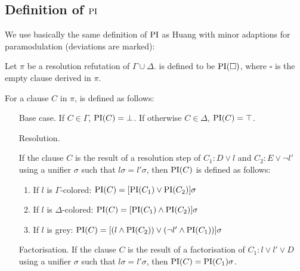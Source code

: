 \documentclass[,%
	paper=a4,%
	DIV14, 
	liststotoc,
	bibtotoc,
	draft=false,%
	numbers=noendperiod
]{scrartcl}
\begin{document}
\subsection{Definition of $\operatorname{PI}$}

We use basically the same definition of $\operatorname{PI}$ as Huang with minor adaptions for paramodulation (deviations are marked):
\begin{defi}
	Let $\pi$ be a resolution refutation of $\Gamma \cup \Delta$.
	 is defined to be $\operatorname{PI}(\square)$, where $\square$ is the empty clause derived in $\pi$.

	For a clause $C$ in $\pi$,  is defined as follows:
	\label{def:PI}
	\begin{itemize}
		\item[Base case.]
			If $C \in \Gamma$, $\operatorname{PI}(C) = \bot$.
			If otherwise $C \in \Delta$, $\operatorname{PI}(C) = \top$.
		\item[Resolution.]
			\label{def:PI_resolution}

      If the clause $C$ is the result of a resolution step of $C_1: D \lor l$ and $C_2: E \lor \lnot l'$ using a unifier $\sigma$ such that $l\sigma = l'\sigma$, then $\operatorname{PI}(C)$ is defined as follows:
      \begin{enumerate}
        \item If $l$ is $\Gamma$-colored: $\operatorname{PI}(C) = [\operatorname{PI}(C_1) \lor \operatorname{PI}(C_2)]\sigma$
        \item If $l$ is $\Delta$-colored: $\operatorname{PI}(C) = [\operatorname{PI}(C_1) \land \operatorname{PI}(C_2)]\sigma$
        \item If $l$ is grey: $\operatorname{PI}(C) = [(l \land \operatorname{PI}(C_2)) \lor (\lnot l' \land \operatorname{PI}(C_1)) ]\sigma $
      \end{enumerate}

    \item[Factorisation.]
      If the clause $C$ is the result of a factorisation of $C_1: l \lor l' \lor D$ using a unifier $\sigma$ such that $l\sigma = l'\sigma$, then $\operatorname{PI}(C) = \operatorname{PI}(C_1)\sigma$.


\end{itemize}
\end{defi}
\end{document}

